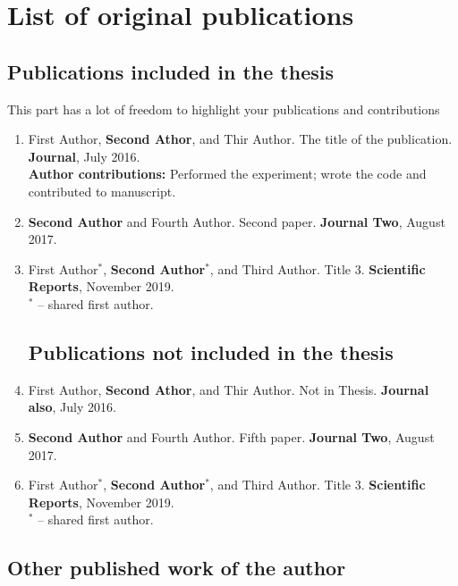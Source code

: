 \chapter*{List of original publications}

\section*{Publications included in the thesis}

This part has a lot of freedom to highlight your publications and contributions

\begin{enumerate}[I]
    
    \item First Author, \textbf{Second Athor}, and Thir Author.  The title of the publication. \textbf{Journal}, July 2016.     \\    
    
    \textbf{Author contributions:} Performed the experiment; wrote the code and contributed to manuscript. 
    \\

    \item \textbf{Second Author} and Fourth Author. Second paper. \textbf{Journal Two}, August 2017.
    
    \item First Author$^{*}$, \textbf{Second Author}$^{*}$, and Third Author. Title 3. \textbf{Scientific Reports}, November 2019. \\
    $^{*}$ -- shared first author.
    

\section*{Publications not included in the thesis}


    \item First Author, \textbf{Second Athor}, and Thir Author.  Not in Thesis. \textbf{Journal also}, July 2016.

    \item \textbf{Second Author} and Fourth Author. Fifth paper. \textbf{Journal Two}, August 2017.
    
    \item First Author$^{*}$, \textbf{Second Author}$^{*}$, and Third Author. Title 3. \textbf{Scientific Reports}, November 2019. \\
    $^{*}$ -- shared first author.
    
\end{enumerate}

\section*{Other published work of the author}
